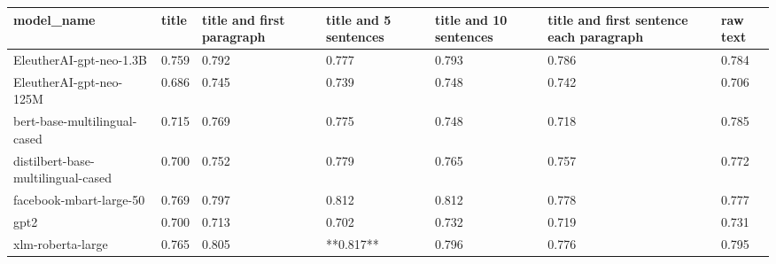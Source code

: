 \begin{tabular}{lllllll}
\toprule
                        model\_name & title & title and first paragraph & title and 5 sentences & title and 10 sentences & title and first sentence each paragraph & raw text \\
\midrule
           EleutherAI-gpt-neo-1.3B & 0.759 &                     0.792 &                 0.777 &                  0.793 &                                   0.786 &    0.784 \\
           EleutherAI-gpt-neo-125M & 0.686 &                     0.745 &                 0.739 &                  0.748 &                                   0.742 &    0.706 \\
      bert-base-multilingual-cased & 0.715 &                     0.769 &                 0.775 &                  0.748 &                                   0.718 &    0.785 \\
distilbert-base-multilingual-cased & 0.700 &                     0.752 &                 0.779 &                  0.765 &                                   0.757 &    0.772 \\
           facebook-mbart-large-50 & 0.769 &                     0.797 &                 0.812 &                  0.812 &                                   0.778 &    0.777 \\
                              gpt2 & 0.700 &                     0.713 &                 0.702 &                  0.732 &                                   0.719 &    0.731 \\
                 xlm-roberta-large & 0.765 &                     0.805 &             **0.817** &                  0.796 &                                   0.776 &    0.795 \\
\bottomrule
\end{tabular}
